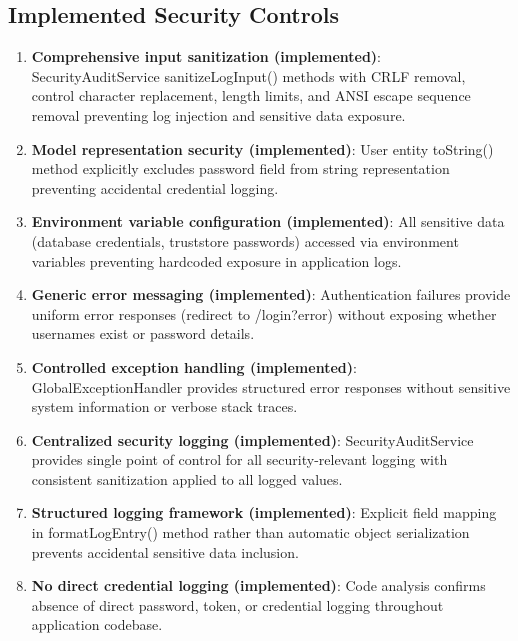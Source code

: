 \documentclass[]{UCD_CS_FYP_Report}
\begin{document}
\subsection*{Implemented Security Controls}
\begin{enumerate}
	\item \textbf{Comprehensive input sanitization (implemented)}: SecurityAuditService sanitizeLogInput() methods with CRLF removal, control character replacement, length limits, and ANSI escape sequence removal preventing log injection and sensitive data exposure.
	\item \textbf{Model representation security (implemented)}: User entity toString() method explicitly excludes password field from string representation preventing accidental credential logging.
	\item \textbf{Environment variable configuration (implemented)}: All sensitive data (database credentials, truststore passwords) accessed via environment variables preventing hardcoded exposure in application logs.
	\item \textbf{Generic error messaging (implemented)}: Authentication failures provide uniform error responses (redirect to /login?error) without exposing whether usernames exist or password details.
	\item \textbf{Controlled exception handling (implemented)}: GlobalExceptionHandler provides structured error responses without sensitive system information or verbose stack traces.
	\item \textbf{Centralized security logging (implemented)}: SecurityAuditService provides single point of control for all security-relevant logging with consistent sanitization applied to all logged values.
	\item \textbf{Structured logging framework (implemented)}: Explicit field mapping in formatLogEntry() method rather than automatic object serialization prevents accidental sensitive data inclusion.
	\item \textbf{No direct credential logging (implemented)}: Code analysis confirms absence of direct password, token, or credential logging throughout application codebase.
\end{enumerate}
\end{document}
